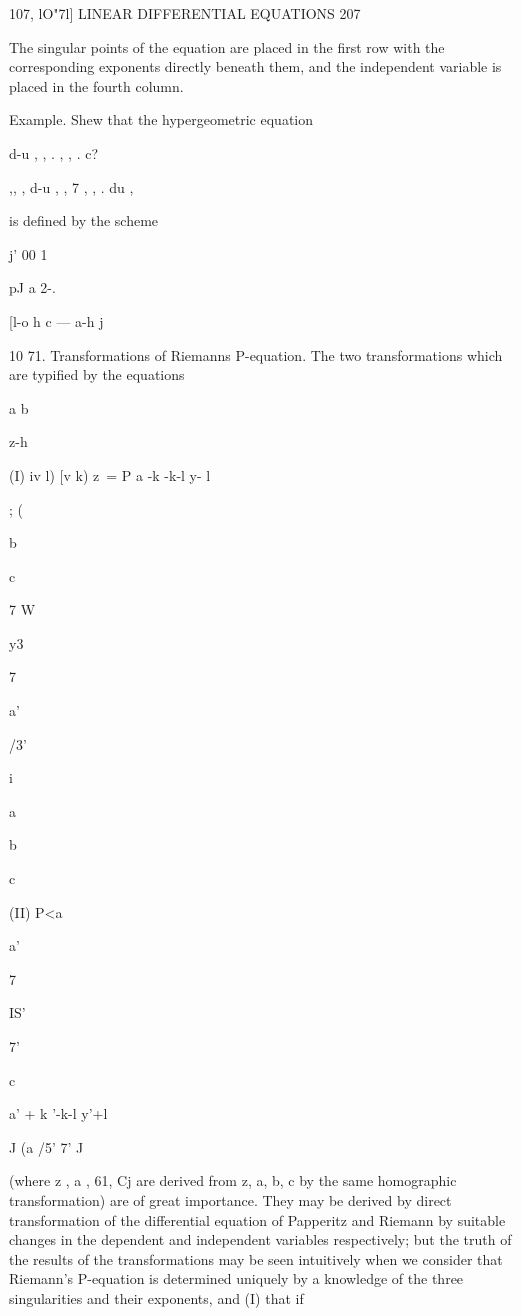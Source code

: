 107, lO"7l] LINEAR DIFFERENTIAL EQUATIONS 207

The singular points of the equation are placed in the first row with
the corresponding exponents directly beneath them, and the independent
variable is placed in the fourth column.



Example. Shew that the hypergeometric equation

d-u , , . , , . c?



,, , d-u , , 7 , , . du ,



is defined by the scheme

j' 00 1 \

pJ a 2-.

[l-o h c — a-h j

10 71. Transformations of Riemanns P-equation. The two transformations
which are typified by the equations

a b



z-h



(I) iv l) [v k) z\ = P a -k -k-l y- l



; (


b


c


7 W


y3


7


a'


/3'


i


a


b


c


(II) P<a

a'


  


7


IS'


7'



c



a' + k '-k-l y'+l



J (a /5' 7' J

(where z , a , 61, Cj are derived from z, a, b, c by the same
homographic transformation) are of great importance. They may be
derived by direct transformation of the differential equation of
Papperitz and Riemann by suitable changes in the dependent and
independent variables respectively; but the truth of the results of
the transformations may be seen intuitively when we consider that
Riemann's P-equation is determined uniquely by a knowledge of the
three singularities and their exponents, and (I) that if





